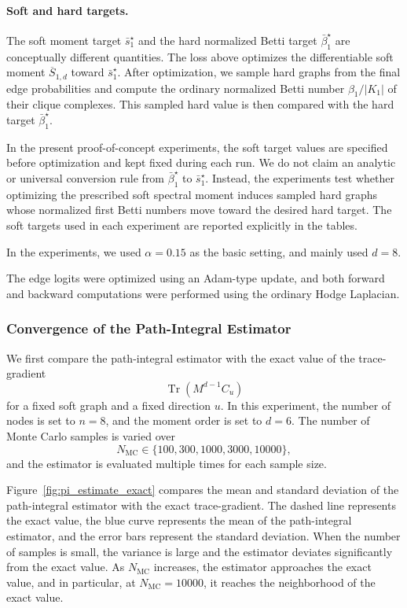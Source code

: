 \documentclass[pdflatex,sn-mathphys-ay]{sn-jnl}%
\theoremstyle{thmstyleone}%
\theoremstyle{thmstyletwo}%
\theoremstyle{thmstylethree}%
\begin{document}
\paragraph{Soft and hard targets.}

The soft moment target \(\bar{s}_1^\star\) and the hard normalized Betti target \(\bar{\beta}_1^\star\) are conceptually different quantities. The loss above optimizes the differentiable soft moment \(\overline{S}_{1,d}\) toward \(\bar{s}_1^\star\). After optimization, we sample hard graphs from the final edge probabilities and compute the ordinary normalized Betti number \(\beta_1/|K_1|\) of their clique complexes. This sampled hard value is then compared with the hard target \(\bar{\beta}_1^\star\).

In the present proof-of-concept experiments, the soft target values are specified before optimization and kept fixed during each run. We do not claim an analytic or universal conversion rule from \(\bar{\beta}_1^\star\) to \(\bar{s}_1^\star\). Instead, the experiments test whether optimizing the prescribed soft spectral moment induces sampled hard graphs whose normalized first Betti numbers move toward the desired hard target. The soft targets used in each experiment are reported explicitly in the tables.

In the experiments, we used $\alpha=0.15$ as the basic setting, and mainly used $d=8$.

The edge logits were optimized using an Adam-type update, and both forward and backward computations were performed using the ordinary Hodge Laplacian.



\subsubsection{Convergence of the Path-Integral Estimator}

We first compare the path-integral estimator with the exact value of the trace-gradient
\[
\operatorname{Tr}(M^{d-1} C_u)
\]
for a fixed soft graph and a fixed direction $u$. In this experiment, the number of nodes is set to $n=8$, and the moment order is set to $d=6$. The number of Monte Carlo samples is varied over
\[
N_{\mathrm{MC}} \in \{100,300,1000,3000,10000\},
\]
and the estimator is evaluated multiple times for each sample size.

Figure~\ref{fig:pi_estimate_exact} compares the mean and standard deviation of the path-integral estimator with the exact trace-gradient. The dashed line represents the exact value, the blue curve represents the mean of the path-integral estimator, and the error bars represent the standard deviation. When the number of samples is small, the variance is large and the estimator deviates significantly from the exact value. As $N_{\mathrm{MC}}$ increases, the estimator approaches the exact value, and in particular, at $N_{\mathrm{MC}}=10000$, it reaches the neighborhood of the exact value.
\end{document}
